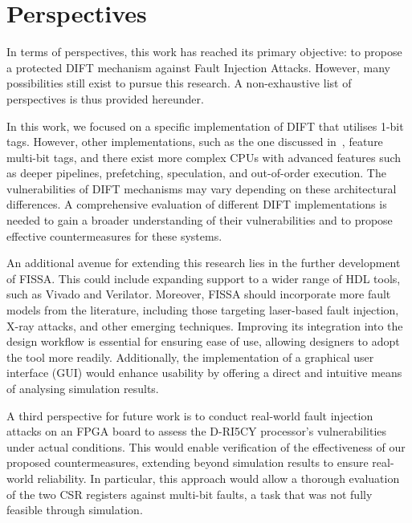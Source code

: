 \section{Perspectives}

In terms of perspectives, this work has reached its primary objective: to propose a protected DIFT mechanism against Fault Injection Attacks. However, many possibilities still exist to pursue this research. A non-exhaustive list of perspectives is thus provided hereunder.

In this work, we focused on a specific implementation of DIFT that utilises 1-bit tags. However, other implementations, such as the one discussed in~\cite{DKK-07-sigarch}, feature multi-bit tags, and there exist more complex CPUs with advanced features such as deeper pipelines, prefetching, speculation, and out-of-order execution. The vulnerabilities of DIFT mechanisms may vary depending on these architectural differences. A comprehensive evaluation of different DIFT implementations is needed to gain a broader understanding of their vulnerabilities and to propose effective countermeasures for these systems.

An additional avenue for extending this research lies in the further development of FISSA. This could include expanding support to a wider range of HDL tools, such as Vivado and Verilator. Moreover, FISSA should incorporate more fault models from the literature, including those targeting laser-based fault injection, X-ray attacks, and other emerging techniques. Improving its integration into the design workflow is essential for ensuring ease of use, allowing designers to adopt the tool more readily. Additionally, the implementation of a graphical user interface (GUI) would enhance usability by offering a direct and intuitive means of analysing simulation results.

A third perspective for future work is to conduct real-world fault injection attacks on an FPGA board to assess the D-RI5CY processor’s vulnerabilities under actual conditions. This would enable verification of the effectiveness of our proposed countermeasures, extending beyond simulation results to ensure real-world reliability. In particular, this approach would allow a thorough evaluation of the two CSR registers against multi-bit faults, a task that was not fully feasible through simulation.

